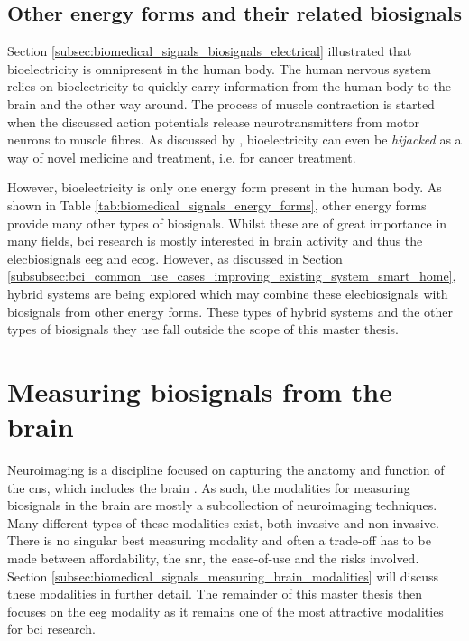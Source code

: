 
\subsection{Other energy forms and their related biosignals}
\label{subsec:biomedical_signals_biosignals_others}

Section \ref{subsec:biomedical_signals_biosignals_electrical} illustrated that bioelectricity is omnipresent in the human body. 
The human nervous system relies on bioelectricity to quickly carry information from the human body to the brain and the other way around.
The process of muscle contraction is started when the discussed action potentials release neurotransmitters from motor neurons to muscle fibres.
As discussed by \citet{bioelectricity_cancer}, bioelectricity can even be \textit{hijacked} as a way of novel medicine and treatment, i.e. for cancer treatment.

However, bioelectricity is only one energy form present in the human body.
As shown in Table \ref{tab:biomedical_signals_energy_forms}, other energy forms provide many other types of \glspl{biosignal}.
Whilst these are of great importance in many fields, \gls{bci} research is mostly interested in brain activity and thus the \glspl{elecbiosignal} \gls{eeg} and \gls{ecog}.
However, as discussed in Section \ref{subsubsec:bci_common_use_cases_improving_existing_system_smart_home}, hybrid systems are being explored which may combine these \glspl{elecbiosignal} with \glspl{biosignal} from other energy forms.
These types of hybrid systems and the other types of \glspl{biosignal} they use fall outside the scope of this master thesis.


\section{Measuring biosignals from the brain}
\label{sec:biomedical_signals_measuring_brain}

Neuroimaging is a discipline focused on capturing the anatomy and function of the \gls{cns}, which includes the brain \citep{neuroimaging}.
As such, the modalities for measuring biosignals in the brain are mostly a subcollection of neuroimaging techniques.
Many different types of these modalities exist, both invasive and non-invasive.
There is no singular best measuring modality and often a trade-off has to be made between affordability, the \gls{snr}, the ease-of-use and the risks involved.
Section \ref{subsec:biomedical_signals_measuring_brain_modalities} will discuss these modalities in further detail.
The remainder of this master thesis then focuses on the \gls{eeg} modality as it remains one of the most attractive modalities for \gls{bci} research.



